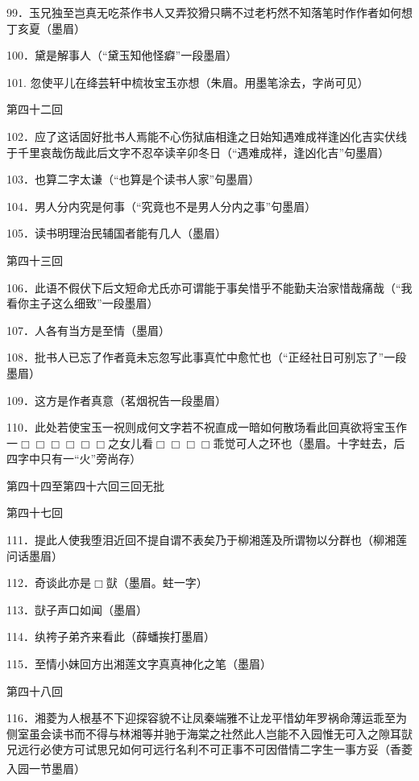 99．玉兄独至岂真无吃茶作书人又弄狡猾只瞒不过老朽然不知落笔时作作者如何想丁亥夏{（\kaishu 墨眉）}

100．黛是解事人{（\kaishu “黛玉知他怪癖”一段墨眉）}

101. 忽使平儿在绛芸轩中梳妆宝玉亦想{（\kaishu 朱眉。用墨笔涂去，字尚可见）}

第四十二回

102．应了这话固好批书人焉能不心伤狱庙相逢之日始知遇难成祥逢凶化吉实伏线于千里哀哉伤哉此后文字不忍卒读辛卯冬日{（\kaishu “遇难成祥，逢凶化吉”句墨眉）}

103．也算二字太谦{（\kaishu “也算是个读书人家”句墨眉）}

104．男人分内究是何事{（\kaishu “究竟也不是男人分内之事”句墨眉）}

105．读书明理治民辅国者能有几人{（\kaishu 墨眉）}

第四十三回

106．此语不假伏下后文短命尤氏亦可谓能于事矣惜乎不能勤夫治家惜哉痛哉{（\kaishu “我看你主子这么细致”一段墨眉）}

107．人各有当方是至情{（\kaishu 墨眉）}

108．批书人已忘了作者竟未忘忽写此事真忙中愈忙也{（\kaishu “正经社日可别忘了”一段墨眉）}

109．这方是作者真意{（\kaishu 茗烟祝告一段墨眉）}

110．此处若使宝玉一祝则成何文字若不祝直成一暗如何散场看此回真欲将宝玉作一{$\Box\Box\Box\Box\Box\Box$}之女儿看{$\Box\Box\Box\Box$}乖觉可人之环也{（\kaishu 墨眉。十字蛀去，后四字中只有一“火”旁尚存）}

第四十四至第四十六回三回无批

第四十七回

111．提此人使我堕泪近回不提自谓不表矣乃于柳湘莲及所谓物以分群也{（\kaishu 柳湘莲问话墨眉）}

112．奇谈此亦是{$\Box$}獃{（\kaishu 墨眉。蛀一字）}

113．獃子声口如闻{（\kaishu 墨眉）}

114．纨袴子弟齐来看此{（\kaishu 薛蟠挨打墨眉）}

115．至情小妹回方出湘莲文字真真神化之笔{（\kaishu 墨眉）}

第四十八回

116．湘菱为人根基不下迎探容貌不让凤秦端雅不让龙平惜幼年罗祸命薄运乖至为侧室虽会读书而不得与林湘等并驰于海棠之社然此人岂能不入园惟无可入之隙耳獃兄远行必使方可试思兄如何可远行名利不可正事不可因借情二字生一事方妥{（\kaishu 香菱入园一节墨眉）}
\hyperref[label-2]{\textsuperscript{}}

